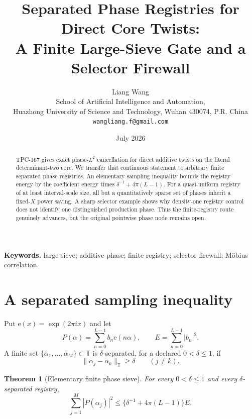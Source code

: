\documentclass[11pt]{article}
\title{\textbf{Separated Phase Registries for Direct Core Twists:\\
A Finite Large-Sieve Gate and a Selector Firewall}}
\author{Liang Wang\\
\small School of Artificial Intelligence and Automation,\\[-2pt]
\small Huazhong University of Science and Technology, Wuhan 430074, P.R. China\\
\small \texttt{wangliang.f@gmail.com}}
\date{July 2026}
\newtheorem{theorem}{Theorem}[section]
\theoremstyle{definition}
\newcommand{\e}{\mathrm e}
\newcommand{\T}{\mathbb T}
\newcommand{\norm}[1]{\lVert#1\rVert}
\begin{document}
\maketitle

\begin{abstract}
TPC-167 gives exact phase-\(L^2\) cancellation for direct additive
twists on the literal determinant-two core.  We transfer that
continuous statement to arbitrary finite separated phase registries.
An elementary sampling inequality bounds the registry energy by the
coefficient energy times
\(\delta^{-1}+4\pi(L-1)\).  For a quasi-uniform registry of at least
interval-scale size, all but a quantitatively sparse set of phases
inherit a fixed-\(X\) power saving.  A sharp selector example shows
why density-one registry control does not identify one distinguished
production phase.  Thus the finite-registry route genuinely advances,
but the original pointwise phase node remains open.
\end{abstract}

\noindent\textbf{Keywords.}
large sieve; additive phase; finite registry; selector firewall;
M\"obius correlation.

\medskip
\noindent{}

\section{A separated sampling inequality}

Put \(\e(x)=\exp(2\pi i x)\) and let
\[
 P(\alpha)=\sum_{n=0}^{L-1}b_n\e(n\alpha),\qquad
 E=\sum_{n=0}^{L-1}|b_n|^2.
\]
A finite set \(\{\alpha_1,\ldots,\alpha_M\}\subset\T\) is
\(\delta\)-separated, for a declared \(0<\delta\le1\), if
\[
 \norm{\alpha_j-\alpha_k}_{\T}\ge\delta\qquad(j\ne k).
\]

\begin{theorem}[Elementary finite phase sieve]\label{thm:sampling}
For every \(0<\delta\le1\) and every
\(\delta\)-separated registry,
\begin{equation}
 \boxed{\quad
 \sum_{j=1}^M|P(\alpha_j)|^2
 \le
 \{\delta^{-1}+4\pi(L-1)\}E.
 \quad}
\label{eq:sampling}
\end{equation}
\end{theorem}
\end{document}
